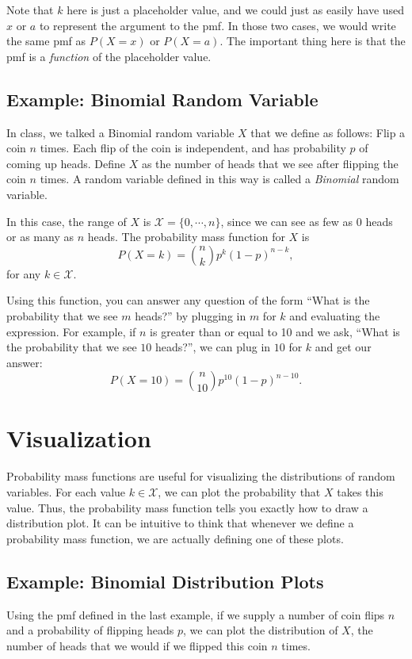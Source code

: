 \documentclass[11pt]{article}
\begin{document}
Note that $k$ here is just a placeholder value, and we could just as easily have used $x$ or $a$ to represent the argument to the pmf. In those two cases, we would write the same pmf as $P(X = x)$ or $P(X = a)$. The important thing here is that the pmf is a \emph{function} of the placeholder value.

\subsection*{Example: Binomial Random Variable}

In class, we talked a Binomial random variable $X$ that we define as follows: Flip a coin $n$ times. Each flip of the coin is independent, and has probability $p$ of coming up heads. Define $X$ as the number of heads that we see after flipping the coin $n$ times. A random variable defined in this way is called a \emph{Binomial} random variable.

In this case, the range of $X$ is $\mathcal X = \{0, \cdots, n\}$, since we can see as few as $0$ heads or as many as $n$ heads. The probability mass function for $X$ is
$$
P(X = k) = {n \choose k} p^k (1-p)^{n-k},
$$
for any $k \in \mathcal X$.

Using this function, you can answer any question of the form ``What is the probability that we see $m$ heads?'' by plugging in $m$ for $k$ and evaluating the expression. For example, if $n$ is greater than or equal to 10 and we ask, ``What is the probability that we see $10$ heads?'', we can plug in $10$ for $k$ and get our answer:
$$
P(X = 10) = {n \choose 10} p^{10} (1-p)^{n-10}.
$$

\section*{Visualization}
Probability mass functions are useful for visualizing the distributions of random variables. For each value $k \in \mathcal X$, we can plot the probability that $X$ takes this value. Thus, the probability mass function tells you exactly how to draw a distribution plot. It can be intuitive to think that whenever we define a probability mass function, we are actually defining one of these plots.

\subsection*{Example: Binomial Distribution Plots}
Using the pmf defined in the last example, if we supply a number of coin flips $n$ and a probability of flipping heads $p$, we can plot the distribution of $X$, the number of heads that we would if we flipped this coin $n$ times.
\end{document}
